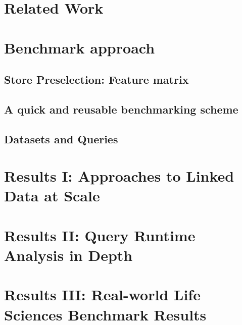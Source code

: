 \documentclass[twocolumn]{bmcart}%
\begin{document}
\section{Related Work}



\section{Benchmark approach}


\subsection{Store Preselection: Feature matrix}
\label{subsec:featurematrix}


\subsection{A quick and reusable benchmarking scheme}
\label{subsec:bmscheme}


\subsection{Datasets and Queries}
\label{subsec:dataqueries}


%

\section{Results I: Approaches to Linked Data at Scale}
\label{sec:tradeoffs}


\section{Results II: Query Runtime Analysis in Depth}
\label{sec:runtimefactors}


\section{Results III: Real-world Life Sciences Benchmark Results}
\label{sec:realworld}

\end{document}
